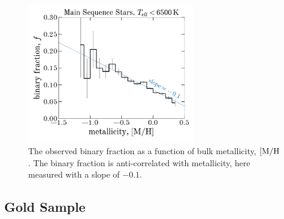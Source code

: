\documentclass[modern]{aastex63}
\begin{document}
\begin{figure}[!t]
    \begin{center}
    \includegraphics[width=0.65\textwidth]{fraction_M_H.pdf}
    \end{center}
    \caption{%
    The observed binary fraction as a function of bulk metallicity, $[{\rm
    M}/{\rm H}$.
    The binary fraction is anti-correlated with metallicity, here measured with
    a slope of $-0.1$.
    \label{fig:binfrac-mh}
    }
\end{figure}


\subsection{Gold Sample}
\label{sec:gold-sample}
\end{document}
